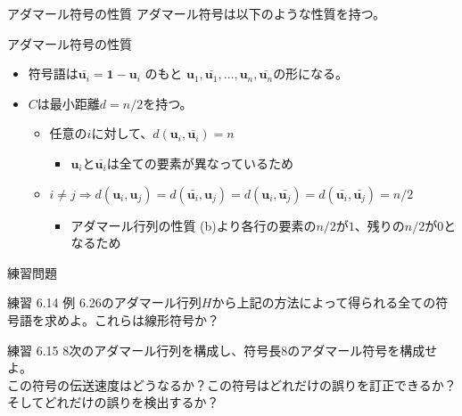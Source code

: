 \documentclass[dvipdfmx,10pt,jsarticle]{beamer}
\begin{document}
  \begin{frame}{アダマール符号の性質}
        アダマール符号は以下のような性質を持つ。
      \begin{block}{アダマール符号の性質}
        \begin{itemize}
          \item 符号語は$\bar{\mathbf{u}_i} = \mathbf{1} - \mathbf{u}_i$ のもと $\mathbf{u}_1, \bar{\mathbf{u}_1}, \ldots , \mathbf{u}_n, \bar{\mathbf{u}_n}$の形になる。
          \item $C$は最小距離$d = n / 2$を持つ。
            \begin{itemize}
              \item 任意の$i$に対して、$d(\mathbf{u}_i, \bar{\mathbf{u}_i}) = n$
                \begin{itemize}
                  \item $\mathbf{u}_i$と$\bar{\mathbf{u}_i}$は全ての要素が異なっているため
                \end{itemize}
              \item $i \neq j \Rightarrow d(\mathbf{u}_i, \mathbf{u}_j) = d(\bar{\mathbf{u}_i}, \mathbf{u}_j) = d(\mathbf{u}_i, \bar{\mathbf{u}_j}) = d(\bar{\mathbf{u}_i}, \bar{\mathbf{u}_j}) = n/2$
                \begin{itemize}
                  \item アダマール行列の性質 (b)より各行の要素の$n/2$が$1$、残りの$n/2$が$0$となるため
                \end{itemize}
            \end{itemize}
        \end{itemize}
      \end{block}
  \end{frame}

  \begin{frame}{練習問題}
        \begin{block}{練習 6.14}
          例 6.26のアダマール行列$H$から上記の方法によって得られる全ての符号語を求めよ。これらは線形符号か？ \\
        \end{block}


        \begin{block}{練習 6.15}
          $8$次のアダマール行列を構成し、符号長$8$のアダマール符号を構成せよ。\\
          この符号の伝送速度はどうなるか？この符号はどれだけの誤りを訂正できるか？そしてどれだけの誤りを検出するか？ \\
        \end{block}
  \end{frame}
\end{document}
